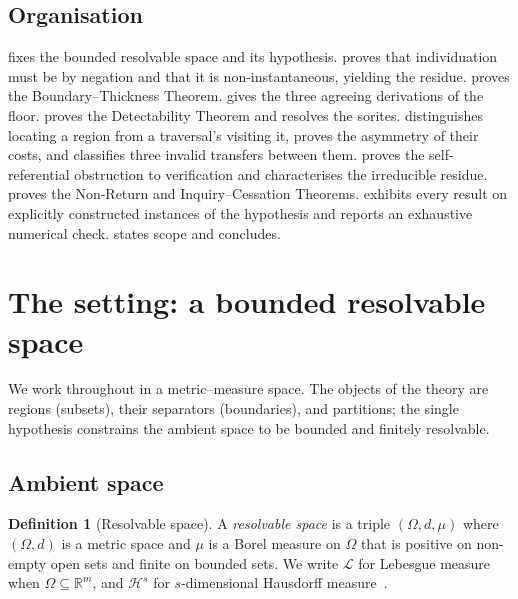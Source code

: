 \documentclass[11pt,a4paper]{article}
\theoremstyle{thmstyle}
\theoremstyle{definition}
\newtheorem{definition}[theorem]{Definition}
\theoremstyle{remark}
\newcommand{\R}{\mathbb{R}}
\newcommand{\Space}{\Omega}
\newcommand{\Leb}{\mathcal{L}}
\newcommand{\Haus}{\mathcal{H}}
\begin{document}
\subsection{Organisation}

 fixes the bounded resolvable space and its hypothesis.
 proves that individuation must be by negation and that it
is non-instantaneous, yielding the residue.  proves the
Boundary--Thickness Theorem.  gives the three agreeing
derivations of the floor.  proves the Detectability Theorem
and resolves the sorites.  distinguishes locating a region
from a traversal's visiting it, proves the asymmetry of their costs, and
classifies three invalid transfers between them.  proves the
self-referential obstruction to verification and characterises the irreducible
residue.  proves the Non-Return and Inquiry--Cessation
Theorems.  exhibits every result on explicitly constructed
instances of the hypothesis and reports an exhaustive numerical check.
 states scope and concludes.


\section{The setting: a bounded resolvable space}
\label{sec:setting}

We work throughout in a metric--measure space. The objects of the theory are
regions (subsets), their separators (boundaries), and partitions; the single
hypothesis constrains the ambient space to be bounded and finitely resolvable.

\subsection{Ambient space}

\begin{definition}[Resolvable space]
\label{def:space}
A \emph{resolvable space} is a triple $(\Space,d,\mu)$ where $(\Space,d)$ is a
metric space and $\mu$ is a Borel measure on $\Space$ that is positive on
non-empty open sets and finite on bounded sets. We write $\Leb$ for Lebesgue
measure when $\Space\subseteq\R^{m}$, and $\Haus^{s}$ for $s$-dimensional
Hausdorff measure~\citep{federer1969,mattila1995}.
\end{definition}
\end{document}
